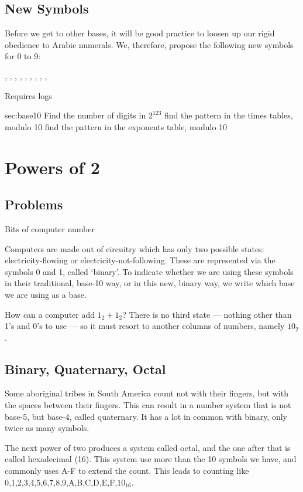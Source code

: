 \subsection{New Symbols}
Before we get to other bases, it will be good practice to loosen up our rigid obedience to Arabic 
numerals.  We, therefore, propose the following new symbols for 0 to 9:

\0, \1, \2, \3, \4, \5, \6, \7, \8, \9

\ExSection[Exercises]
Requires logs
\begin{exercises}{sec:base10}
\prob Find the number of digits in $2^{123}$
\prob find the pattern in the times tables, modulo 10
\prob find the pattern in the exponents table, modulo 10
\end{exercises}

\newpage
\section{Powers of 2}
\subsection{Problems}
Bits of computer number
\newpage

Computers are made out of circuitry which has only two possible states: electricity-flowing or
electricity-not-following.  These are represented via the symbols 0 and 1, called `binary'.  
To indicate whether we are using these symbols in their traditional, base-10 way, or in 
this new, binary way, we write which base we are using as a base.

How can a computer add $1_2+1_2$?  There is no third state --- nothing other than 1's and 0's
to use --- so it must resort to another columns of numbers, namely $10_2$.  

\subsection{Binary, Quaternary, Octal }
Some aboriginal tribes in South America count not with their fingers, but with the spaces between
their fingers.  This can result in a number system that is not base-5, but base-4, called quaternary.
It has a lot in common with binary, only twice as many symbols.

The next power of two produces a system called octal, and the one after that is called hexadecimal
(16).  This system use more than the 10 symbols we have, and commonly uses A-F to extend the
count.  This leads to counting like 0,1,2,3,4,5,6,7,8,9,A,B,C,D,E,F,$10_{16}$.

